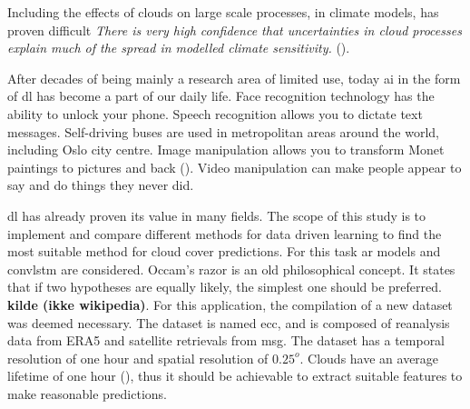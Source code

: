 
Including the effects of clouds on large scale processes, in climate models, has proven difficult \textit{There is very high confidence that uncertainties in cloud processes explain much of the spread in modelled climate sensitivity.  } (\cite{IPCC_CH9_climate_models}). %

After decades of being mainly a research area of limited use, today \acrfull{ai} in the form of \acrfull{dl} has become a part of our daily life. Face recognition technology has the ability to unlock your phone. Speech recognition allows you to dictate text messages. %
Self-driving buses are used in metropolitan areas around the world, including Oslo city centre.  %
Image manipulation allows you to transform Monet paintings to pictures and back (\cite{zhu2017_cycleGAN_monet_zebra}). Video manipulation can make people appear to say and do things they never did. 

\acrshort{dl} has already proven its value in many fields. The scope of this study is to implement and compare different methods for data driven learning to find the most suitable method for cloud cover predictions. For this task \acrfull{ar} models and \acrfull{convlstm} are considered. 
Occam's razor is an old philosophical concept. It states that if two hypotheses are equally likely, the simplest one should be preferred. \textbf{kilde (ikke wikipedia)}. For this application, the compilation of a new dataset was deemed necessary. The dataset is named \acrfull{ecc}, and is composed of reanalysis data from ERA5 and satellite retrievals from \acrfull{msg}.%
The dataset has a temporal resolution of one hour and spatial resolution of $0.25^o$. Clouds have an average lifetime of one hour (\cite{lohmann2016}), thus it should be achievable to extract suitable features to make reasonable predictions. 


